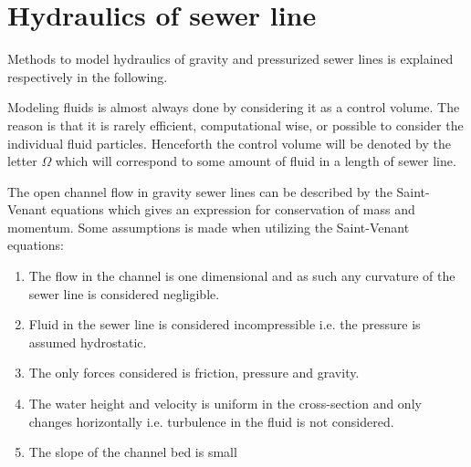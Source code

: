 \section{Hydraulics of sewer line}\label{se:hydraulics_of_sewer_line}

Methods to model hydraulics of gravity and pressurized sewer lines is explained respectively in the following. 

Modeling fluids is almost always done by considering it as a control volume. The reason is that it is rarely efficient, computational wise, or possible to consider the individual fluid particles.
Henceforth the control volume will be denoted by the letter $\Omega$ which will correspond to some amount of fluid in a length of sewer line.

The open channel flow in gravity sewer lines can be described by the Saint-Venant equations which gives an expression for conservation of mass and momentum.
Some assumptions is made when utilizing the Saint-Venant equations:

\begin{table}[H]
\begin{enumerate}
\item The flow in the channel is one dimensional and as such any curvature of the sewer line is considered negligible.
\item Fluid in the sewer line is considered incompressible i.e. the pressure is assumed hydrostatic.
\item The only forces considered is friction, pressure and gravity.
\item The water height and velocity is uniform in the cross-section and only changes horizontally i.e. turbulence in the fluid is not considered.
\item The slope of the channel bed is small
\end{enumerate}
\label{tab:saintbernard_assumptions}
\end{table}


